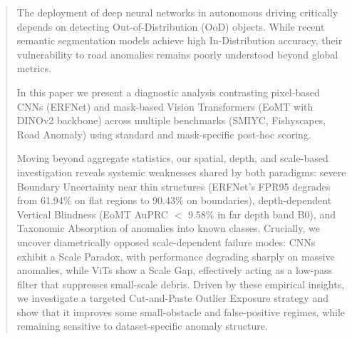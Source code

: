 \begin{abstract}
The deployment of deep neural networks in autonomous driving critically depends on detecting Out-of-Distribution (OoD) objects. While recent semantic segmentation models achieve high In-Distribution accuracy, their vulnerability to road anomalies remains poorly understood beyond global metrics.

In this paper we present a diagnostic analysis contrasting pixel-based CNNs (ERFNet) and mask-based Vision Transformers (EoMT with DINOv2 backbone) across multiple benchmarks (SMIYC, Fishyscapes, Road Anomaly) using standard and mask-specific post-hoc scoring.

Moving beyond aggregate statistics, our spatial, depth, and scale-based investigation reveals systemic weaknesses shared by both paradigms: severe Boundary Uncertainty near thin structures (ERFNet's FPR95 degrades from 61.94\% on flat regions to 90.43\% on boundaries), depth-dependent Vertical Blindness (EoMT AuPRC $<$ 9.58\% in far depth band B0), and Taxonomic Absorption of anomalies into known classes. Crucially, we uncover diametrically opposed scale-dependent failure modes: CNNs exhibit a Scale Paradox, with performance degrading sharply on massive anomalies, while ViTs show a Scale Gap, effectively acting as a low-pass filter that suppresses small-scale debris. Driven by these empirical insights, we investigate a targeted Cut-and-Paste Outlier Exposure strategy and show that it improves some small-obstacle and false-positive regimes, while remaining sensitive to dataset-specific anomaly structure.
\end{abstract}
